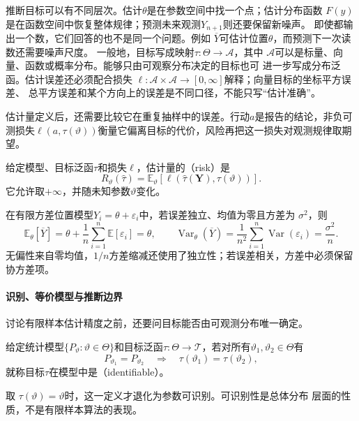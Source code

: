 推断目标可以有不同层次。估计\(\theta\)是在参数空间中找一个点；估计分布函数
\(F(y)\)是在函数空间中恢复整体规律；预测未来观测\(Y_{n+1}\)则还要保留新噪声。
即使都输出一个数，它们回答的也不是同一个问题。例如
\(\overline{Y}\)可估计位置\(\theta\)，而预测下一次读数还需要噪声尺度。
一般地，目标写成映射\(\tau:\Theta\to\mathcal A\)，其中
\(\mathcal A\)可以是标量、向量、函数或概率分布。能够只由可观察分布决定的目标也可
进一步写成分布泛函。估计误差还必须配合损失
\(\ell:\mathcal A\times\mathcal A\to[0,\infty]\)解释；向量目标的坐标平方误差、
总平方误差和某个方向上的误差是不同口径，不能只写“估计准确”。

估计量定义后，还需要比较它在重复抽样中的误差。行动\(a\)是报告的结论，非负可测损失\(\ell(a,\tau(\vartheta))\)衡量它偏离目标的代价，风险再把这一损失对观测规律取期望。
\begin{definition}[估计量的风险]
  \label{def:statistics-estimator-risk}
给定模型、目标泛函\(\tau\)和损失\(\ell\)，估计量的（risk）是
\[
  R_\vartheta(\widehat\tau)
  =\mathbb{E}_\vartheta[
    \ell(\widehat\tau(\bm Y),\tau(\vartheta))].
\]
它允许取\(+\infty\)，并随未知参数\(\vartheta\)变化。
\end{definition}

在有限方差位置模型\(Y_i=\theta+\varepsilon_i\)中，若误差独立、均值为零且方差为
\(\sigma^2\)，则
\[
  \mathbb{E}_\theta[\overline Y]
  =\theta+\frac1n\sum_{i=1}^n\mathbb{E}[\varepsilon_i]
  =\theta,\qquad
  \operatorname{Var}_\theta(\overline Y)
  =\frac1{n^2}\sum_{i=1}^n\operatorname{Var}(\varepsilon_i)
  =\frac{\sigma^2}{n}.
\]
无偏性来自零均值，\(1/n\)方差缩减还使用了独立性；若误差相关，方差中必须保留
协方差项。

\paragraph{识别、等价模型与推断边界}
讨论有限样本估计精度之前，还要问目标能否由可观测分布唯一确定。
\begin{definition}[目标可识别性]
  \label{def:statistics-identifiability}
  给定统计模型\(\{P_\vartheta:\vartheta\in\Theta\}\)和目标泛函\(\tau:\Theta\to\mathcal T\)，若对所有\(\vartheta_1,\vartheta_2\in\Theta\)有
\[
  P_{\vartheta_1}=P_{\vartheta_2}
  \quad\Longrightarrow\quad
  \tau(\vartheta_1)=\tau(\vartheta_2),
\]
就称目标\(\tau\)在模型中是（identifiable）。
\end{definition}
取
\(\tau(\vartheta)=\vartheta\)时，这一定义才退化为参数可识别。可识别性是总体分布
层面的性质，不是有限样本算法的表现。

